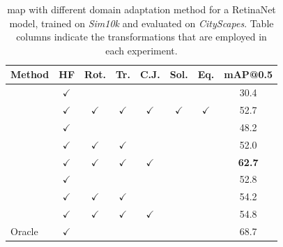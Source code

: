 \documentclass[%
    corpo=12pt,
    twoside,
    stile=classica,   
    tipotesi=magistrale,
    evenboxes,
    english,
	numerazioneromana,
]{toptesi}
\begin{document}
\begin{table}[p]
	\centering
	\caption{\gls{map} with different domain adaptation method for a RetinaNet model, trained on \textit{Sim10k} and evaluated on \textit{CityScapes}. Table columns indicate the transformations that are employed in each experiment.\label{table:retinanet}}
	\begin{NiceTabularX}{\linewidth}{Xccccccc}
		\toprule
		Method & HF & Rot. & Tr. & C.J. & Sol. & Eq. & mAP@0.5 \\
		\midrule
		 & $\checkmark$ & & & & & & 30.4   \\
		 & $\checkmark$ & $\checkmark$ & $\checkmark$ & $\checkmark$ & $\checkmark$ & $\checkmark$ & 52.7   \\
		\midrule
		 & $\checkmark$ & & & & & & 48.2   \\
		& $\checkmark$ & $\checkmark$ & $\checkmark$ & & & & 52.0   \\
		& $\checkmark$ & $\checkmark$ & $\checkmark$ & $\checkmark$ & & & \textbf{62.7}   \\
		\midrule
		 & $\checkmark$ & & & & & & 52.8   \\
		& $\checkmark$ & $\checkmark$ & $\checkmark$ & & & & 54.2   \\
		& $\checkmark$ & $\checkmark$ & $\checkmark$ & $\checkmark$ & & & 54.8   \\
		\midrule
		Oracle & $\checkmark$ & & & & & & 68.7   \\
		\bottomrule
	\end{NiceTabularX}
	

\end{table}
\end{document}
